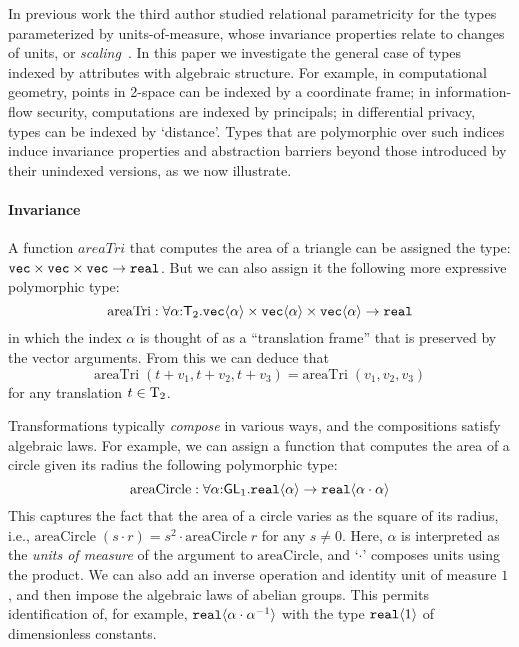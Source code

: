 In previous work the third author studied relational parametricity for
the types parameterized by units-of-measure, whose invariance 
properties relate to changes of units, or \emph{scaling}~\cite{kennedy97relational}. 
In this paper we investigate the general case of types indexed by attributes
with algebraic structure. For example, in computational geometry, points in
2-space can be indexed by a coordinate frame; in information-flow
security, computations are indexed by principals; in differential privacy, types
can be indexed by `distance'. Types that are
polymorphic over such indices induce invariance properties and
abstraction barriers beyond those introduced by their unindexed
versions, as we now illustrate.

\paragraph{Invariance}
A function $\mathit{areaTri}$ that computes the area of a triangle
can be assigned the type:
$\textup{\texttt{vec}}\times\textup{\texttt{vec}}\times\textup{\texttt{vec}}\to\texttt{real}$.
But we can also assign it the following more expressive polymorphic
type:
\[
\mathrm{areaTri} : \forall\alpha\mathord:\mathsf{T}_2.
  \textup{\texttt{vec}}\langle \alpha \rangle \times \textup{\texttt{vec}}\langle \alpha \rangle \times \textup{\texttt{vec}}\langle \alpha \rangle \to \texttt{real} \\
\]
in which the index $\alpha$ is thought of as a ``translation frame''
that is preserved by the vector arguments. From this we can deduce
that
\[
\mathrm{areaTri}\;(t + v_1, t + v_2, t + v_3) = 
\mathrm{areaTri}\;(v_1, v_2, v_3)
\]
for any translation $t\in\mathrm{T}_2$.

Transformations typically \emph{compose} in various
ways, and the compositions satisfy algebraic laws. For example, 
we can assign a function that computes the area of a circle given its
radius the following polymorphic type:
\[
\mathrm{areaCircle} : \forall\alpha\mathord:\mathsf{GL}_1.\textup{\texttt{real}}\langle \alpha \rangle\to
\textup{\texttt{real}}\langle \alpha\cdot\alpha \rangle
\]
This captures the fact that the area of a circle varies as the square
of its radius, i.e., $\mathrm{areaCircle}\;(s\cdot r) =
s^2\cdot \mathrm{areaCircle}\;r$ for any $s\neq 0$.  Here, $\alpha$ is interpreted as
the \emph{units of measure} of the argument to $\mathrm{areaCircle}$,
and `$\cdot$' composes units using the product. We can also add an
inverse operation and identity unit of measure $1$, and then impose the
algebraic laws of abelian groups. This permits identification of, for
example, $\textup{\texttt{real}}\langle \alpha\cdot\alpha^{-1} \rangle$ with the type
$\textup{\texttt{real}}\langle 1 \rangle$ of dimensionless constants.

